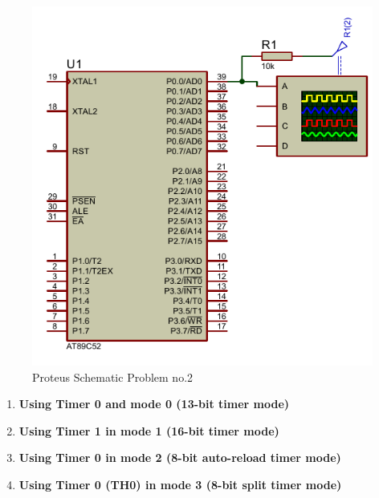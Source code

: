 \documentclass{article}
\begin{document}
\begin{figure}[H]
    \centering
    \includegraphics[scale=1.6,cframe=blue 0.5pt 3pt]{2.PDF}
    \caption{Proteus Schematic Problem no.2}
\end{figure}


\begin{enumerate}
    \item \textbf {Using Timer 0 and mode 0 (13-bit timer mode) }


    \item \textbf {Using Timer 1 in mode 1 (16-bit timer mode) }


    \item \textbf {Using Timer 0 in mode 2 (8-bit auto-reload timer mode) }


    \item \textbf {Using Timer 0 (TH0) in mode 3 (8-bit split timer mode) }

\end{enumerate}
\end{document}
